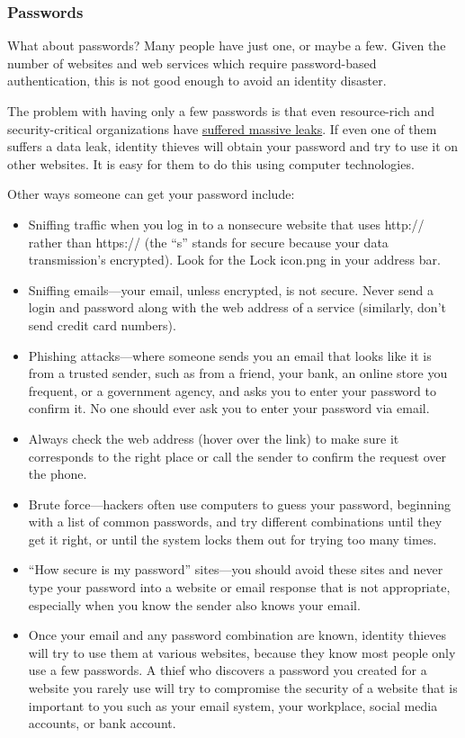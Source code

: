\documentclass[
  letterpaper,
  DIV=11,
  numbers=noendperiod]{scrreprt}
\providecommand{\tightlist}{%
  \setlength{\itemsep}{0pt}\setlength{\parskip}{0pt}}\usepackage{longtable,booktabs,array}
\begin{document}
\subsubsection*{Passwords}\label{passwords}

What about passwords? Many people have just one, or maybe a few. Given
the number of websites and web services which require password-based
authentication, this is not good enough to avoid an identity disaster.

The problem with having only a few passwords is that even resource-rich
and security-critical organizations have
\href{https://gizmodo.com.au/2017/05/over-560-million-passwords-discovered-in-anonymous-online-database/}{suffered
massive leaks}. If even one of them suffers a data leak, identity
thieves will obtain your password and try to use it on other websites.
It is easy for them to do this using computer technologies.

Other ways someone can get your password include:

\begin{itemize}
\tightlist
\item
  Sniffing traffic when you log in to a nonsecure website that uses
  http:// rather than https:// (the ``s'' stands for secure because your
  data transmission's encrypted). Look for the Lock icon.png in your
  address bar.
\item
  Sniffing emails---your email, unless encrypted, is not secure. Never
  send a login and password along with the web address of a service
  (similarly, don't send credit card numbers).
\item
  Phishing attacks---where someone sends you an email that looks like it
  is from a trusted sender, such as from a friend, your bank, an online
  store you frequent, or a government agency, and asks you to enter your
  password to confirm it. No one should ever ask you to enter your
  password via email.
\item
  Always check the web address (hover over the link) to make sure it
  corresponds to the right place or call the sender to confirm the
  request over the phone.
\item
  Brute force---hackers often use computers to guess your password,
  beginning with a list of common passwords, and try different
  combinations until they get it right, or until the system locks them
  out for trying too many times.
\item
  ``How secure is my password'' sites---you should avoid these sites and
  never type your password into a website or email response that is not
  appropriate, especially when you know the sender also knows your
  email.
\item
  Once your email and any password combination are known, identity
  thieves will try to use them at various websites, because they know
  most people only use a few passwords. A thief who discovers a password
  you created for a website you rarely use will try to compromise the
  security of a website that is important to you such as your email
  system, your workplace, social media accounts, or bank account.
\end{itemize}
\end{document}
